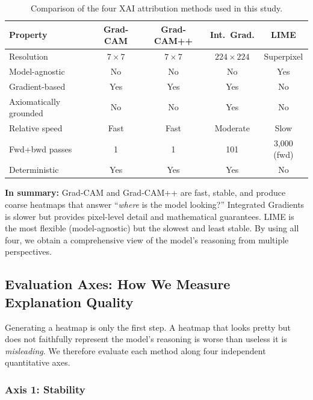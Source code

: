 \documentclass[12pt, a4paper]{article}
\begin{document}
\begin{table}[H]
\centering
\caption{Comparison of the four XAI attribution methods used in this study.}
\label{tab:method_comparison}
\begin{tabular}{lcccc}
\toprule
\textbf{Property} & \textbf{Grad-CAM} & \textbf{Grad-CAM++}
& \textbf{Int.\ Grad.} & \textbf{LIME} \\
\midrule
Resolution       & $7\times7$ & $7\times7$ & $224\times224$ & Superpixel \\
Model-agnostic   & No        & No         & No             & Yes \\
Gradient-based   & Yes       & Yes        & Yes            & No \\
Axiomatically grounded & No  & No         & Yes            & No \\
Relative speed   & Fast      & Fast       & Moderate       & Slow \\
Fwd+bwd passes   & 1         & 1          & 101            & 3{,}000 (fwd) \\
Deterministic    & Yes       & Yes        & Yes            & No \\
\bottomrule
\end{tabular}
\end{table}

\textbf{In summary:} Grad-CAM and Grad-CAM++ are fast, stable, and produce
coarse heatmaps that answer ``\emph{where} is the model looking?''  Integrated
Gradients is slower but provides pixel-level detail and mathematical
guarantees.  LIME is the most flexible (model-agnostic) but the slowest and
least stable.  By using all four, we obtain a comprehensive view of the model's
reasoning from multiple perspectives.


\subsection{Evaluation Axes: How We Measure Explanation Quality}
\label{sec:eval_axes}

Generating a heatmap is only the first step.  A heatmap that looks pretty but
does not faithfully represent the model's reasoning is worse than useless 
it is \emph{misleading}.  We therefore evaluate each method along four
independent quantitative axes.

\subsubsection{Axis 1: Stability}
\end{document}
